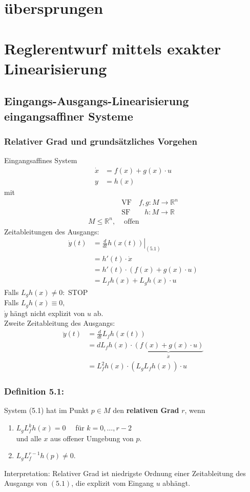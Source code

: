 \documentclass[ngerman]{tudscrreprt}
\begin{document}
\chapter{übersprungen}
\chapter{Reglerentwurf mittels exakter Linearisierung}
\section{Eingangs-Ausgangs-Linearisierung eingangsaffiner Systeme}
\subsection{Relativer Grad und grundsätzliches Vorgehen}
Eingangsaffines System \begin{align*}
\dot x &= f(x) + g(x)\cdot u \\ 
y &= h(x) \tag{5.1}
\end{align*}
mit \begin{align*} 
&\text{VF} \quad  f,g:M\to \mathbb{R}^n\\
&\text{SF} \quad \quad h  :M\to \mathbb{R}\\
M\le \mathbb{R}^n,& \text{ offen}
\end{align*}
Zeitableitungen des Ausgangs: \begin{align*} \dot y(t) &= \left.\frac{d}{dt} h(x(t))\right|_{(5.1)}\\ 
&=h'(t)\cdot \dot x\\ 
&=h'(t)\cdot (f(x) + g(x) \cdot u)\\ 
&=L_fh(x) + L_gh(x)\cdot u 
\end{align*}
Falls $L_gh(x) \ne 0: $ STOP\\ 
Falls $L_gh(x) \equiv 0,$\\$\dot y$ hängt nicht explizit von $u$ ab.\\ 
Zweite Zeitableitung des Ausgangs:
\begin{align*}
\ddot y(t) &= \frac{d}{dt} L_fh(x(t))\\ 
&=dL_fh(x)\cdot \underbrace{(f(x) + g(x)\cdot u)}_{\dot x}\\ 
&=L_f^2h(x)\cdot(L_gL_f h(x))\cdot u
\end{align*}
\subsection*{Definition 5.1:} System (5.1) hat im Punkt $p\in M$ den \textbf{relativen Grad} $r$, wenn 
\begin{enumerate}
\item $L_g L_f^k h(x) = 0\quad $ für $k= 0, \dots, r-2$\\ und alle $x$ aus offener Umgebung von $p$.
\item $L_g L_f^{r-1} h(p) \ne 0$. 
\end{enumerate}
Interpretation: Relativer Grad ist niedrigste Ordnung einer Zeitableitung des Ausgangs von $(5.1)$, die explizit vom Eingang $u$ abhängt.\\ 
\end{document}
